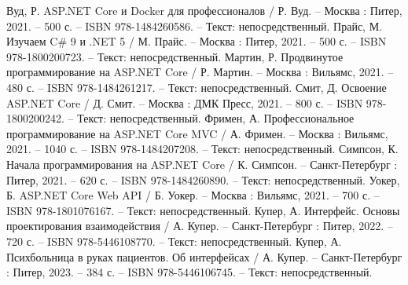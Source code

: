 \begin{thebibliography}{9}
	 Вуд, Р. ASP.NET Core и Docker для профессионалов / Р. Вуд. – Москва : Питер, 2021. – 500 с. – ISBN 978-1484260586. – Текст: непосредственный.
	 Прайс, М. Изучаем C\# 9 и .NET 5 / М. Прайс. – Москва : Питер, 2021. – 500 с. – ISBN 978-1800200723. – Текст: непосредственный.
	 Мартин, Р. Продвинутое программирование на ASP.NET Core / Р. Мартин. – Москва : Вильямс, 2021. – 480 с. – ISBN 978-1484261217. – Текст: непосредственный.
	 Смит, Д. Освоение ASP.NET Core / Д. Смит. – Москва : ДМК Пресс, 2021. – 800 с. – ISBN 978-1800200242. – Текст: непосредственный.
	 Фримен, А. Профессиональное программирование на ASP.NET Core MVC / А. Фримен. – Москва : Вильямс, 2021. – 1040 с. – ISBN 978-1484207208. – Текст: непосредственный.
	 Симпсон, К. Начала программирования на ASP.NET Core / К. Симпсон. – Санкт-Петербург : Питер, 2021. – 620 с. – ISBN 978-1484260890. – Текст: непосредственный.
	 Уокер, Б. ASP.NET Core Web API / Б. Уокер. – Москва : Вильямс, 2021. – 700 с. – ISBN 978-1801076167. – Текст: непосредственный.
	 Купер, А. Интерфейс. Основы проектирования взаимодействия / А. Купер. – Санкт-Петербург : Питер, 2022. – 720 с. – ISBN 978-5446108770. – Текст: непосредственный.
	 Купер, А. Психбольница в руках пациентов. Об интерфейсах / А. Купер. – Санкт-Петербург : Питер, 2023. – 384 с. – ISBN 978-5446106745. – Текст: непосредственный.
\end{thebibliography}